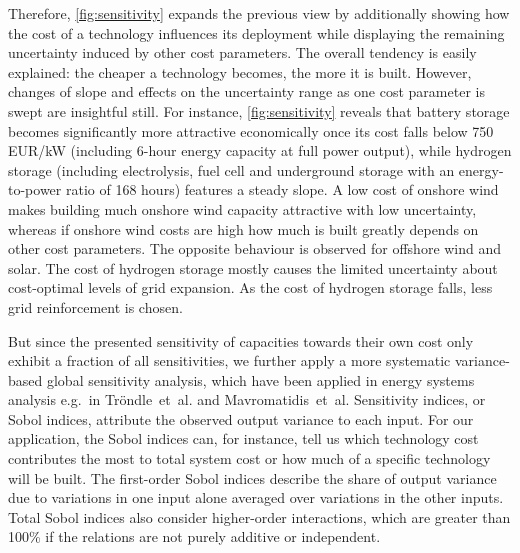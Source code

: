 
Therefore, \cref{fig:sensitivity} expands the previous view by additionally
showing how the cost of a technology influences its deployment while displaying
the remaining uncertainty induced by other cost parameters. The overall tendency
is easily explained: the cheaper a technology becomes, the more it is built.
However, changes of slope and effects on the uncertainty range as one cost
parameter is swept are insightful still. For instance, \cref{fig:sensitivity}
reveals that battery storage becomes significantly more attractive economically
once its cost falls below 750 EUR/kW (including 6-hour energy capacity at full
power output), while hydrogen storage (including electrolysis, fuel cell and
underground storage with an energy-to-power ratio of 168 hours) features a
steady slope. A low cost of onshore wind makes building much onshore wind
capacity attractive with low uncertainty, whereas if onshore wind costs are high
how much is built greatly depends on other cost parameters. The opposite
behaviour is observed for offshore wind and solar. The cost of hydrogen storage
mostly causes the limited uncertainty about cost-optimal levels of grid
expansion. As the cost of hydrogen storage falls, less grid reinforcement is
chosen.

But since the presented sensitivity of capacities towards their own cost only
exhibit a fraction of all sensitivities, we further apply a more systematic
variance-based global sensitivity analysis, which have been applied in energy
systems analysis e.g.~in Tröndle~et~al.\cite{trondle_trade-offs_2020} and
Mavromatidis~et~al.\cite{mavromatidis_uncertainty_2018} Sensitivity indices, or
Sobol indices, attribute the observed output variance to each input.
\cite{sudret_global_2008} For our application, the Sobol indices can, for
instance, tell us which technology cost contributes the most to total system
cost or how much of a specific technology will be built. The first-order Sobol
indices describe the share of output variance due to variations in one input
alone averaged over variations in the other inputs. Total Sobol indices also
consider higher-order interactions, which are greater than 100\% if the
relations are not purely additive or independent.


